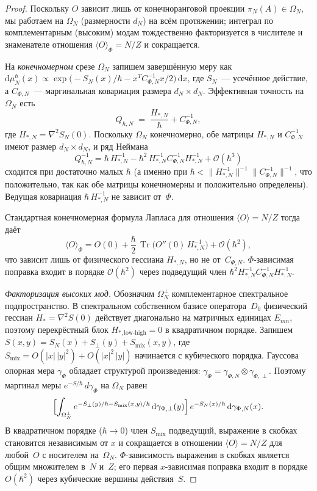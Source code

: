 \documentclass[12pt,a4paper]{article}
\theoremstyle{plain}
\theoremstyle{definition}
\theoremstyle{remark}
\newcommand{\dd}{\mathrm{d}}
\newcommand{\Tr}{\operatorname{Tr}}
\newcommand{\order}{\mathcal{O}}
\begin{document}
\begin{proof}
Поскольку $O$ зависит лишь от конечноранговой проекции
$\pi_N(A) \in \Omega_N$, мы работаем на $\Omega_N$
(размерности $d_N$) на всём протяжении; интеграл по
комплементарным (высоким) модам тождественно факторизуется в
числителе и знаменателе отношения
$\langle O\rangle_\Phi = N/Z$ и сокращается.

На \emph{конечномерном} срезе $\Omega_N$ запишем завершённую меру
как
$\dd\mu_N^\hbar(x) \propto \exp\bigl(-S_N(x)/\hbar
- x^T C_{\Phi,N}^{-1} x/2\bigr)\,\dd x$,
где $S_N$~--- усечённое действие, а $C_{\Phi,N}$~--- маргинальная
ковариация размера $d_N \times d_N$.  Эффективная точность на
$\Omega_N$ есть
\[
  Q_{\hbar,N} \;=\; \frac{H_{*,N}}{\hbar} + C_{\Phi,N}^{-1},
\]
где $H_{*,N} = \nabla^2 S_N(0)$.  Поскольку $\Omega_N$
конечномерно, обе матрицы $H_{*,N}$ и $C_{\Phi,N}^{-1}$ имеют
размер $d_N \times d_N$, и ряд Неймана
\[
  Q_{\hbar,N}^{-1}
  = \hbar\,H_{*,N}^{-1}
  - \hbar^2\,H_{*,N}^{-1}C_{\Phi,N}^{-1}H_{*,N}^{-1}
  + \order(\hbar^3)
\]
сходится при достаточно малых $\hbar$ (а именно при
$\hbar < \|H_{*,N}^{-1}\|^{-1}\|C_{\Phi,N}^{-1}\|^{-1}$, что
положительно, так как обе матрицы конечномерны и положительно
определены).  Ведущая ковариация $\hbar\,H_{*,N}^{-1}$ не зависит
от~$\Phi$.

Стандартная конечномерная формула Лапласа для отношения
$\langle O\rangle = N/Z$ тогда даёт
\[
  \langle O\rangle_\Phi
  = O(0) + \frac{\hbar}{2}\,\Tr\bigl(O''(0)\,H_{*,N}^{-1}\bigr)
  + \order(\hbar^2),
\]
что зависит лишь от физического гессиана $H_{*,N}$, но не
от~$C_{\Phi,N}$.  $\Phi$-зависимая поправка входит в порядке
$\order(\hbar^2)$ через подведущий член
$\hbar^2 H_{*,N}^{-1}C_{\Phi,N}^{-1}H_{*,N}^{-1}$.

\emph{Факторизация высоких мод.}
Обозначим $\Omega_N^\perp$ комплементарное спектральное подпространство.
В спектральном собственном базисе оператора~$D_0$ физический гессиан
$H_* = \nabla^2 S(0)$ действует диагонально на матричных единицах
$E_{mn}$, поэтому перекрёстный блок $H_{*,\mathrm{low\text{-}high}} = 0$
в квадратичном порядке.
Запишем $S(x,y) = S_N(x) + S_\perp(y) + S_{\mathrm{mix}}(x,y)$,
где $S_{\mathrm{mix}} = O(|x|\,|y|^2) + O(|x|^2\,|y|)$ начинается с
кубического порядка.  Гауссова опорная мера $\gamma_\Phi$ обладает
структурой произведения: $\gamma_\Phi = \gamma_{\Phi,N}\otimes\gamma_{\Phi,\perp}$.
Поэтому маргинал меры
$e^{-S/\hbar}\,d\gamma_\Phi$ на $\Omega_N$ равен
\[
  \Bigl[\int_{\Omega_N^\perp} e^{-S_\perp(y)/\hbar
  - S_{\mathrm{mix}}(x,y)/\hbar}\,
  \dd\gamma_{\Phi,\perp}(y)\Bigr]\,
  e^{-S_N(x)/\hbar}\,\dd\gamma_{\Phi,N}(x).
\]
В квадратичном порядке ($\hbar \to 0$) член $S_{\mathrm{mix}}$ подведущий,
выражение в скобках становится независимым от $x$ и сокращается в отношении
$\langle O\rangle = N/Z$
для любой~$O$ с носителем на~$\Omega_N$.
$\Phi$-зависимость выражения в скобках является общим множителем
в~$N$ и~$Z$; его первая $x$-зависимая поправка входит в порядке
$O(\hbar^2)$ через кубические вершины действия~$S$.
\end{proof}
\end{document}
